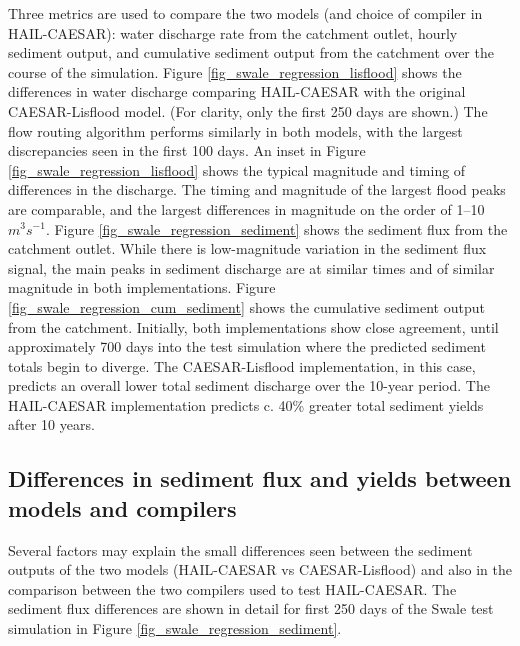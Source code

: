 Three metrics are used to compare the two models (and choice of compiler in HAIL-CAESAR): water discharge rate from the catchment outlet, hourly sediment output, and cumulative sediment output from the catchment over the course of the simulation. 
Figure \ref{fig_swale_regression_lisflood} shows the differences in water discharge comparing HAIL-CAESAR with the original CAESAR-Lisflood model. (For clarity, only the first 250 days are shown.) The flow routing algorithm performs similarly in both models, with the largest discrepancies seen in the first 100 days. An inset in Figure \ref{fig_swale_regression_lisflood} shows the typical magnitude and timing of differences in the discharge. The timing and magnitude of the largest flood peaks are comparable, and the largest differences in magnitude on the order of 1--10 \(m^3s^{-1}\).
Figure \ref{fig_swale_regression_sediment} shows the sediment flux from the catchment outlet. While there is low-magnitude variation in the sediment flux signal, the main peaks in sediment discharge are at similar times and of similar magnitude in both implementations. Figure \ref{fig_swale_regression_cum_sediment} shows the cumulative sediment output from the catchment. Initially, both implementations show close agreement, until approximately 700 days into the test simulation where the predicted sediment totals begin to diverge. The CAESAR-Lisflood implementation, in this case, predicts an overall lower total sediment discharge over the 10-year period. The HAIL-CAESAR implementation predicts c. 40\% greater total sediment yields after 10 years.

\subsection{Differences in sediment flux and yields between models and compilers}

Several factors may explain the small differences seen between the sediment outputs of the two models (HAIL-CAESAR vs CAESAR-Lisflood) and also in the comparison between the two compilers used to test HAIL-CAESAR. The sediment flux differences are shown in detail for first 250 days of the Swale test simulation in Figure \ref{fig_swale_regression_sediment}.

